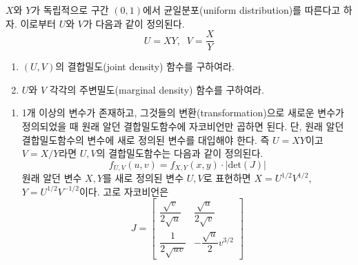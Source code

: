 \documentclass[answers]{exam}
\begin{document}
\newpage
{}
\begin{questions}
   \question
   $X$와 $Y$가 독립적으로 구간 $(0,1)$에서 균일분포(uniform distribution)를 따른다고 하자. 이로부터 $U$와 $V$가 다음과 같이 정의된다.
   $$
    U=XY,\;\; V=\dfrac{X}{Y}
   $$
   \begin{enumerate}
    \item $(U,V)$의 결합밀도(joint density) 함수를 구하여라.
    \item $U$와 $V$ 각각의 주변밀도(marginal density) 함수를 구하여라.
   \end{enumerate}
   \begin{solution}
    \begin{enumerate}
      \item 1개 이상의 변수가 존재하고, 그것들의 변환(transformation)으로 새로운 변수가 정의되었을 때 원래 알던 결합밀도함수에 자코비언만 곱하면 된다. 단, 원래 알던 결합밀도함수의 변수에 새로 정의된 변수를 대입해야 한다. 즉 $U=XY$이고 $V=X/Y$라면 $U,V$의 결합밀도함수는 다음과 같이 정의된다.
      $$
        f_{U,V}\left(u,v\right) = f_{X,Y}\left(x,y\right)\cdot \left|\mathrm{det}\left(J\right)\right|
      $$
      원래 알던 변수 $X,Y$를 새로 정의된 변수 $U,V$로 표현하면 $X=U^{1/2}V^{1/2}$, $Y=U^{1/2}V^{-1/2}$이다. 고로 자코비언은 
      $$
        J=\begin{bmatrix} \dfrac{\sqrt{v}}{2\sqrt{u}}& \dfrac{\sqrt{u}}{2\sqrt{v}} \\ \dfrac{1}{2\sqrt{uv}}& -\dfrac{\sqrt{u}}{2}v^{3/2}  \end{bmatrix}
      $$
    

\end{enumerate}
\end{solution}
\end{questions}
\end{document}
